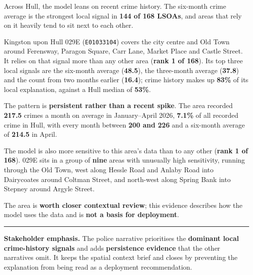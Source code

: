 \begin{tcolorbox}
\begin{minipage}[t]{0.55\linewidth}
\footnotesize
\RaggedRight

Across Hull, the model leans on recent crime history. The six-month crime
average is the strongest local signal in \textbf{144 of 168 LSOAs}, and areas
that rely on it heavily tend to sit next to each other.

\vspace{1.2mm}

Kingston upon Hull 029E (\texttt{E01033104}) covers the city centre and Old
Town around Ferensway, Paragon Square, Carr Lane, Market Place and Castle
Street. It relies on that signal more than any other area
(\textbf{rank 1 of 168}). Its top three local signals are the six-month
average (\textbf{48.5}), the three-month average (\textbf{37.8}) and the count
from two months earlier (\textbf{16.4}); crime history makes up
\textbf{83\%} of its local explanation, against a Hull median of
\textbf{53\%}.

\vspace{1.2mm}

The pattern is \textbf{persistent rather than a recent spike}. The area
recorded \textbf{217.5} crimes a month on average in January--April 2026,
\textbf{7.1\%} of all recorded crime in Hull, with every month between
\textbf{200 and 226} and a six-month average of \textbf{214.5} in April.

\vspace{1.2mm}

The model is also more sensitive to this area's data than to any other
(\textbf{rank 1 of 168}). 029E sits in a group of \textbf{nine} areas with
unusually high sensitivity, running through the Old Town, west along Hessle
Road and Anlaby Road into Dairycoates around Coltman Street, and north-west
along Spring Bank into Stepney around Argyle Street.

\vspace{1.2mm}

The area is \textbf{worth closer contextual review}; this evidence describes
how the model uses the data and is \textbf{not a basis for deployment}.

\end{minipage}

\vspace{2mm}
\hrule
\vspace{1mm}

{\scriptsize
\textbf{Stakeholder emphasis.}
The police narrative prioritises the \textbf{dominant local crime-history
signals} and adds \textbf{persistence evidence} that the other narratives
omit. It keeps the spatial context brief and closes by preventing the
explanation from being read as a deployment recommendation.
}

\end{tcolorbox}


